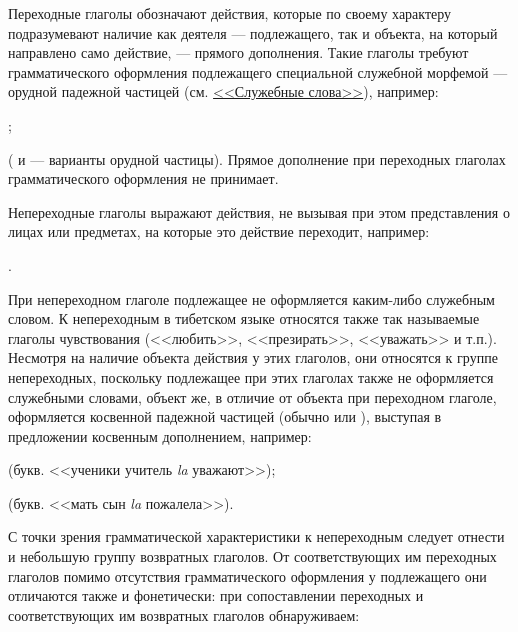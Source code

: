 Переходные глаголы обозначают действия, которые по своему характеру подразумевают наличие как деятеля --- подлежащего, так и объекта, на который направлено само действие, --- прямого дополнения. Такие глаголы требуют грамматического оформления подлежащего специальной служебной морфемой --- орудной падежной частицей (см. \hyperref[sec:ss]{<<Служебные слова>>}), например:
\begin{prfsample}
	\item {};
	\item {}
\end{prfsample}
( и  --- варианты орудной частицы). Прямое дополнение при переходных глаголах грамматического оформления не принимает.

Непереходные глаголы выражают действия, не вызывая при этом представления о лицах или предметах, на которые это действие переходит, например:
\begin{prfsample}
	\item {}.
\end{prfsample}
При непереходном глаголе подлежащее не оформляется каким-либо служебным словом. К непереходным в тибетском языке относятся также так называемые глаголы чувствования (<<любить>>, <<презирать>>, <<уважать>> и т.п.). Несмотря на наличие объекта действия у этих глаголов, они относятся к группе непереходных, поскольку подлежащее при этих глаголах также не оформляется служебными словами, объект же, в отличие от объекта при переходном глаголе, оформляется косвенной падежной частицей (обычно  или ), выступая в предложении косвенным дополнением, например:
\begin{prfsample}
	\item {} (букв. <<ученики учитель \emph{la} уважают>>);
	\item {} (букв. <<мать сын \emph{la} пожалела>>).
\end{prfsample}

С точки зрения грамматической характеристики к непереходным следует отнести и небольшую группу возвратных глаголов. От соответствующих им переходных глаголов помимо отсутствия грамматического оформления у подлежащего они отличаются также и фонетически: при сопоставлении переходных и соответствующих им возвратных глаголов обнаруживаем:

